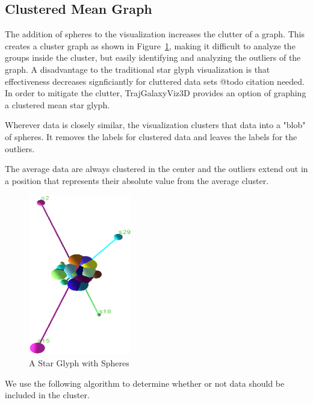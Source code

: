 \documentclass[]{article}
\begin{document}
\subsection{Clustered Mean Graph}
\label{ss:clustered}

The addition of spheres to the visualization increases the clutter of a graph.  This creates a cluster graph as shown in Figure~\ref{fig:clustered}, making it difficult to analyze the groups inside the cluster, but easily identifying and analyzing the outliers of the graph. A disadvantage to the traditional star glyph visualization is that effectiveness decreases signficiantly for cluttered data sets @todo citation needed. In order to mitigate the clutter, TrajGalaxyViz3D provides an option of graphing a clustered mean star glyph.

Wherever data is closely similar, the visualization clusters that data into a "blob" of spheres. It removes the labels for clustered data and leaves the labels for the outliers.

The average data are always clustered in the center and the outliers extend out in a position that represents their absolute value from the average cluster.

\begin{figure}[htb]
\begin{center}
\includegraphics[width=0.4\textwidth, keepaspectratio=true]{images/clustered}
\end{center}
\caption{A Star Glyph with Spheres}
\label {fig:clustered}
\end{figure}

We use the following algorithm to determine whether or not data should be included in the cluster.
\end{document}
